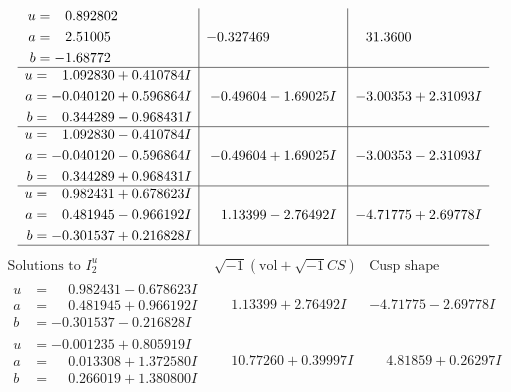 \documentclass[1p]{elsarticle_modified}
\theoremstyle{definition}
\newcommand{\I}{\sqrt{-1}}
\begin{document}
$$\begin{array}{c|c|c}
\begin{aligned}
u &= \phantom{-}0.892802\phantom{ +0.000000I} \\
a &= \phantom{-}2.51005\phantom{ +0.000000I} \\
b &= -1.68772\phantom{ +0.000000I}\end{aligned}
 & -0.327469\phantom{ +0.000000I} & \phantom{-}31.3600\phantom{ +0.000000I} \\ \hline\begin{aligned}
u &= \phantom{-}1.092830 + 0.410784 I \\
a &= -0.040120 + 0.596864 I \\
b &= \phantom{-}0.344289 - 0.968431 I\end{aligned}
 & -0.49604 - 1.69025 I & -3.00353 + 2.31093 I \\ \hline\begin{aligned}
u &= \phantom{-}1.092830 - 0.410784 I \\
a &= -0.040120 - 0.596864 I \\
b &= \phantom{-}0.344289 + 0.968431 I\end{aligned}
 & -0.49604 + 1.69025 I & -3.00353 - 2.31093 I \\ \hline\begin{aligned}
u &= \phantom{-}0.982431 + 0.678623 I \\
a &= \phantom{-}0.481945 - 0.966192 I \\
b &= -0.301537 + 0.216828 I\end{aligned}
 & \phantom{-}1.13399 - 2.76492 I & -4.71775 + 2.69778 I\\
 \hline 
 \end{array}$$\newpage$$\begin{array}{c|c|c}  
\text{Solutions to }I^u_{2}& \I (\text{vol} + \sqrt{-1}CS) & \text{Cusp shape}\\
 \hline 
\begin{aligned}
u &= \phantom{-}0.982431 - 0.678623 I \\
a &= \phantom{-}0.481945 + 0.966192 I \\
b &= -0.301537 - 0.216828 I\end{aligned}
 & \phantom{-}1.13399 + 2.76492 I & -4.71775 - 2.69778 I \\ \hline\begin{aligned}
u &= -0.001235 + 0.805919 I \\
a &= \phantom{-}0.013308 + 1.372580 I \\
b &= \phantom{-}0.266019 + 1.380800 I\end{aligned}
 & \phantom{-}10.77260 + 0.39997 I & \phantom{-}4.81859 + 0.26297 I \\ \hline\begin{aligned}

\end{aligned}
\end{array}$$
\end{document}
